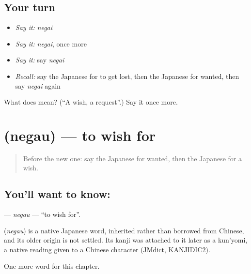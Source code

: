 \subsection*{Your turn}
\begin{itemize}
\raggedright
  \item \emph{Say it:} \emph{negai}
  \item \emph{Say it:} \emph{negai}, once more
  \item \emph{Say it:} say \emph{negai}
  \item \emph{Recall:} say the Japanese for to get lost, then the Japanese for wanted, then say \emph{negai} again
\end{itemize}

\begin{tcolorbox}[breakable,colback=teal!4,colframe=teal!35!black,title={Before you move on}]
What does  mean? (\textquotedblleft{}A wish, a request\textquotedblright{}.) Say it once more.
\end{tcolorbox}
\section[\texorpdfstring{\ja{ねがう} (negau)}{ねがう (negau)}]{ (negau) — to wish for}

\label{lesson:JA-C92-negau}



\begin{quote}
Before the new one: say the Japanese for wanted, then the Japanese for a wish.
\end{quote}

\subsection*{You'll want to know: }
\textbf{} — \emph{negau} — \textquotedblleft{}to wish for\textquotedblright{}.

\begin{cousinweb}
\textbf{} (\emph{negau}) is a native Japanese word, inherited rather than borrowed from Chinese, and its older origin is not settled. Its kanji was attached to it later as a kun'yomi, a native reading given to a Chinese character (JMdict, KANJIDIC2).
\end{cousinweb}

\begin{grammarlens}[title={What you've built}]
One more word for this chapter.
\end{grammarlens}

